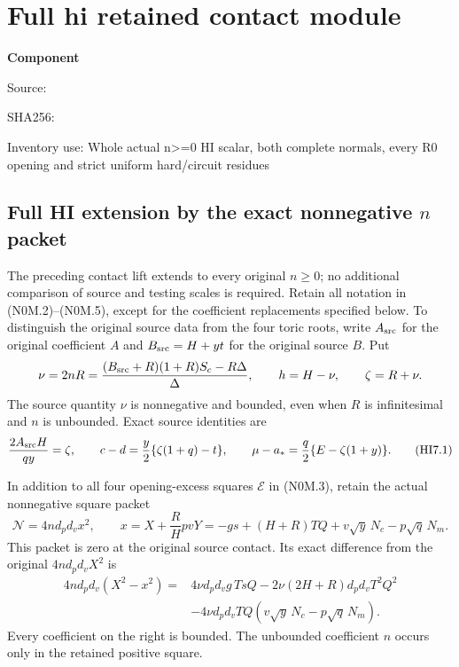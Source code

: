\chapter{Full hi retained contact module}
\label{component:p4363feef60dd}
\noindent\textbf{Component }\par
{\small\noindent Source: \par}
{\small\noindent SHA256: \par}
{\small\noindent Inventory use: Whole actual n>=0 HI scalar, both complete normals, every R0 opening and strict uniform hard/circuit residues\par}
\medskip
\section{Full HI extension by the exact nonnegative \texorpdfstring{$n$}{n} packet}
\label{p4363feef60dd:sec:r7-hi-full-retained}
The preceding contact lift extends to every original $n\geq0$; no
additional comparison of source and testing scales is required. Retain
all notation in (N0M.2)--(N0M.5), except for the coefficient replacements
specified below. To distinguish the original source data from the four
toric roots, write $A_{\rm src}$ for the original coefficient $A$ and
$B_{\rm src}=H+yt$ for the original source $B$. Put
\[
 \nu=2nR=\frac{(B_{\rm src}+R)(1+R)S_c-R\Delta}{\Delta},
 \qquad h=H-\nu,\qquad \zeta=R+\nu.
\]
The source quantity $\nu$ is nonnegative and bounded, even when $R$ is
infinitesimal and $n$ is unbounded. Exact source identities are
\[
 \frac{2A_{\rm src}H}{qy}=\zeta,\qquad
 c-d=\frac y2\{\zeta(1+q)-t\},\qquad
 \mu-a_*=\frac q2\{E-\zeta(1+y)\}.             \tag{HI7.1}
\]

In addition to all four opening-excess squares $\mathcal E$ in
(N0M.3), retain the actual nonnegative square packet
\[
 \mathcal N=4nd_pd_vx^2,\qquad
 x=X+\frac RHpvY
   =-g s+(H+R)TQ+v\sqrt y\,N_c-p\sqrt q\,N_m.
                                                               \tag{HI7.2}
\]
This packet is zero at the original source contact. Its exact difference
from the original $4nd_pd_vX^2$ is
\begin{align*}
 4nd_pd_v(X^2-x^2)={}&4\nu d_pd_vg\,TsQ
 -2\nu(2H+R)d_pd_vT^2Q^2\\
 &-4\nu d_pd_vTQ(v\sqrt y\,N_c-p\sqrt q\,N_m).
\end{align*}
Every coefficient on the right is bounded. The unbounded coefficient
$n$ occurs only in the retained positive square.


